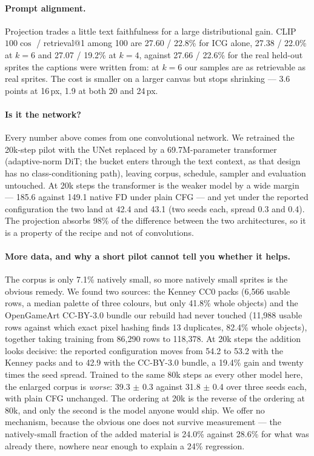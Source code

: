 \documentclass[10pt,twocolumn,letterpaper]{article}
\begin{document}
\paragraph{Prompt alignment.}
Projection trades a little text faithfulness for a large distributional gain. CLIP $100\cos$ / retrieval@1 among 100
are 27.60 / 22.8\% for ICG alone, 27.38 / 22.0\% at $k{=}6$ and 27.07 / 19.2\% at $k{=}4$, against 27.66 / 22.6\% for
the real held-out sprites the captions were written from: at $k{=}6$ our samples are as retrievable as real sprites.
The cost is smaller on a larger canvas but stops shrinking --- 3.6 points at 16\,px, 1.9 at both 20 and 24\,px.

\paragraph{Is it the network?}
Every number above comes from one convolutional network. We retrained the 20k-step pilot with the UNet replaced by a
69.7M-parameter transformer (adaptive-norm DiT; the bucket enters through the text context, as that design has no
class-conditioning path), leaving corpus, schedule, sampler and evaluation untouched. At 20k steps the transformer is
the weaker model by a wide margin --- 185.6 against 149.1 native FD under plain CFG --- and yet under the reported
configuration the two land at 42.4 and 43.1 (two seeds each, spread 0.3 and 0.4). The projection absorbs 98\% of the
difference between the two architectures, so it is a property of the recipe and not of convolutions.

\paragraph{More data, and why a short pilot cannot tell you whether it helps.}
The corpus is only 7.1\% natively small, so more natively small sprites is the obvious remedy. We found two sources:
the Kenney CC0 packs (6{,}566 usable rows, a median palette of three colours, but only 41.8\% whole objects) and the
OpenGameArt CC-BY-3.0 bundle our rebuild had never touched (11{,}988 usable rows against which exact pixel hashing
finds 13 duplicates, 82.4\% whole objects), together taking training from 86{,}290 rows to 118{,}378. At 20k steps the
addition looks decisive: the reported configuration moves from 54.2 to 53.2 with the Kenney packs and to 42.9 with the
CC-BY-3.0 bundle, a 19.4\% gain and twenty times the seed spread. Trained to the same 80k steps as every other model
here, the enlarged corpus is \emph{worse}: 39.3 $\pm$ 0.3 against 31.8 $\pm$ 0.4 over three seeds each, with plain CFG
unchanged. The ordering at 20k is the reverse of the ordering at 80k, and only the second is the model anyone would
ship. We offer no mechanism, because the obvious one does not survive measurement --- the natively-small fraction of
the added material is 24.0\% against 28.6\% for what was already there, nowhere near enough to explain a 24\%
regression.
\end{document}
